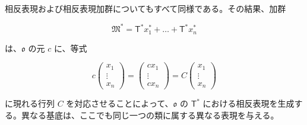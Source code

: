 相反表現および相反表現加群についてもすべて同様である。その結果、加群

\[\mathfrak{M}^* = \mathsf{T}^* x_1^* + \dots + \mathsf{T}^* x_n^*\]

は、$\mathfrak{o}$ の元 $c$ に、等式

\[
c\begin{pmatrix}x_1\\ \vdots\\ x_n\end{pmatrix}
=\begin{pmatrix}cx_1\\ \vdots\\ cx_n\end{pmatrix}
=C\begin{pmatrix}x_1\\ \vdots\\ x_n\end{pmatrix}
\]

に現れる行列 $C$ を対応させることによって、$\mathfrak{o}$ の $\mathsf T^*$ における相反表現を生成する。異なる基底は、ここでも同じ一つの類に属する異なる表現を与える。
